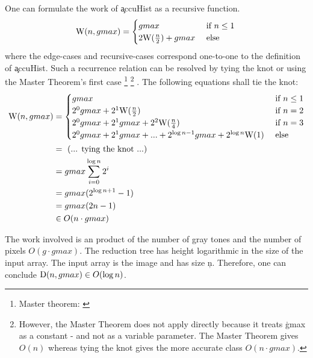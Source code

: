     One can formulate the work of \c{accuHist} as a recursive function.
    \begin{equation*}
    \textrm{W}(n,gmax) = \begin{cases}
                 gmax & \text{ if } n \le 1 \\ 
                 2 \textrm{W}(\frac{n}{2}) + gmax & \text{ else }
                \end{cases} \\
    \end{equation*}
    where the edge-cases and recursive-cases correspond one-to-one
    to the definition of \c{accuHist}.
    Such a recurrence relation can be resolved by tying the knot
    or using the Master Theorem's first case
    \footnote{Master theorem: \cite{Cormen2001}}
    \footnote{However, the Master Theorem does not apply directly
    because it treats \c{gmax} as a constant -
    and not as a variable parameter.
    The Master Theorem gives $O(n)$ whereas tying the knot
    gives the more accurate class $O(n \cdot gmax)$.}
    .
    The following equations shall tie the knot:
    \begin{equation*}
    \begin{split}
    \textrm{W}(n,gmax)
      & = \begin{cases}
            gmax & \text{ if } n \le 1 \\ 
            2^0gmax + 2^1\textrm{W}(\frac{n}{2}) & \text{ if } n = 2 \\
            2^0gmax + 2^1gmax + 2^2\textrm{W}(\frac{n}{4}) & \text{ if } n = 3 \\
            2^0gmax + 2^1gmax + ... + 2^{\log n - 1}gmax + 2^{\log n}\textrm{W}(1) & \text{ else }
          \end{cases} \\
      & = \textrm{ (... tying the knot ...) } \\
      & = gmax \sum_{i=0}^{\log n}{2^i} \\
      & = gmax (2^{\log n + 1} - 1) \\
      & = gmax (2n - 1) \\
      & \in O(n \cdot gmax) \\
    \end{split}
    \end{equation*}
    
    The work involved is an product of the number of gray tones and
    the number of pixels $O(g \cdot gmax)$.
    The reduction tree has height logarithmic
    in the size of the input array. The input array is the image and
    has size \c{n}. Therefore, one can conclude
    $\textrm{D}(n, gmax) \in O(\log n)$.
  
